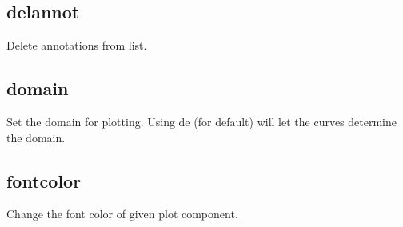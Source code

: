 \documentclass[letterpaper,10pt,english]{sphinxmanual}
\begin{document}
\begin{sphinxVerbatim}[commandchars=\\\{\}]
\PYG{p}{[}\PYG{p}{]}    
\end{sphinxVerbatim}


\subsection{delannot}
\label{\detokenize{plot_control_cmds:delannot}}
Delete annotations from list.

\begin{sphinxVerbatim}[commandchars=\\\{\}]
\PYG{p}{[}\PYG{p}{]}  
\end{sphinxVerbatim}


\subsection{domain}
\label{\detokenize{plot_control_cmds:domain}}
Set the domain for plotting. Using de (for default) will let the curves determine the domain.

\begin{sphinxVerbatim}[commandchars=\\\{\}]
\PYG{p}{[}\PYG{p}{]}   


\PYG{p}{[}\PYG{p}{]}  
\end{sphinxVerbatim}


\subsection{fontcolor}
\label{\detokenize{plot_control_cmds:fontcolor}}
Change the font color of given plot component.

\begin{sphinxVerbatim}[commandchars=\\\{\}]
\PYG{p}{[}\PYG{p}{]}  \PYG{p}{[}         \PYG{p}{]} 
\end{sphinxVerbatim}
\end{document}
